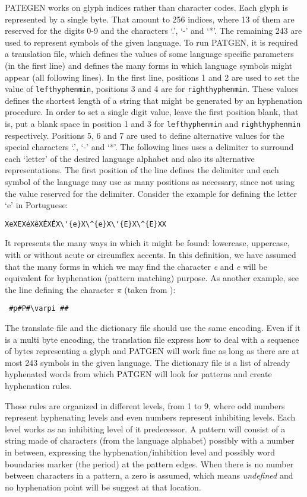\documentclass{article}
\begin{document}
PATEGEN works on glyph indices rather than character codes. Each glyph is
represented by a single byte. That amount to 256 indices, where 13 of them are
reserved for the digits 0-9 and the characters `.', `-' and `*'. The remaining 243
are used to represent symbols of the given language. To run PATGEN, it is required a
translation file, which defines the values of some language specific parameters
(in the first line) and defines the many forms in which language symbols might
appear (all following lines). In the first line, positions 1 and 2 are used to
set the value of \verb|lefthyphenmin|, positions 3 and 4 are for
\verb|righthyphenmin|. These values defines the shortest length of a string
that might be generated by an hyphenation procedure. In order to set a single
digit value, leave the first position blank, that is, put a blank space in
position 1 and 3 for \verb|lefthyphenmin| and \verb|righthyphenmin|
respectively. Positions 5, 6 and 7 are used to define alternative values for
the special characters `.', `-' and `*'. The following lines uses a delimiter
to surround each `letter' of the desired language alphabet and also its
alternative representations. The first position of the line defines the
delimiter and each symbol of the language may use as many positions as
necessary, since not using the value reserved for the delimiter. Consider the
example for defining the letter `e' in Portuguese: 
\begin{verbatim}
XeXEXéXêXÉXÊX\'{e}X\^{e}X\'{E}X\^{E}XX 
\end{verbatim}
It represents the many ways in which it might be found: lowercase, uppercase,
with or without acute or circumflex accents. In this definition, we have
assumed that the many forms in which we may find the character \emph{e} and
\emph{e} will be equivalent for hyphenation (pattern matching) purpose. As
another example, see the line defining the character $\pi$ (taken from
\cite{haralambous2021}): \begin{verbatim} #p#P#\varpi ## \end{verbatim}

The translate file and the dictionary file should use the same encoding. Even
if it is a multi byte encoding, the translation file express how to deal with a
sequence of bytes representing a glyph and PATGEN will work fine as long as
there are at most 243 symbols in the given language.
The dictionary file is a list of already hyphenated words from which PATGEN
will look for patterns and create hyphenation rules. 

Those rules are organized
in different levels, from 1 to 9, where odd numbers represent hyphenating
levels and even numbers represent inhibiting levels. Each level works as an
inhibiting level of it predecessor. A pattern will consist of a string made of
characters (from the language alphabet) possibly with a number in between,
expressing the hyphenation/inhibition level and possibly word boundaries marker
(the period) at the pattern edges. When there is no number between characters
in a pattern, a zero is assumed, which means \emph{undefined} and no
hyphenation point will be suggest at that location.
\end{document}
